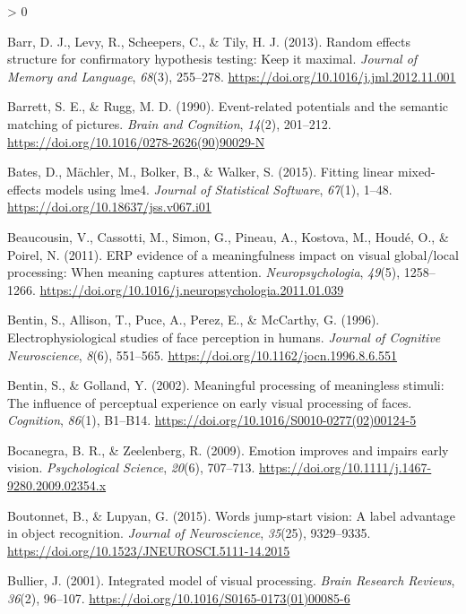 \documentclass[
  english,
  man,floatsintext]{apa7}
\newlength{\cslhangindent}
\newenvironment{CSLReferences}[2] %
 {%
  \setlength{\parindent}{0pt}
  \ifodd #1 \everypar{\setlength{\hangindent}{\cslhangindent}}\ignorespaces\fi
  \ifnum #2 > 0
  \setlength{\parskip}{#2\baselineskip}
  \fi
 }%
 {}
\begin{document}
\begin{CSLReferences}{1}{0}
\leavevmode\hypertarget{ref-barr2013}{}%
Barr, D. J., Levy, R., Scheepers, C., \& Tily, H. J. (2013). Random effects structure for confirmatory hypothesis testing: Keep it maximal. \emph{Journal of Memory and Language}, \emph{68}(3), 255--278. \url{https://doi.org/10.1016/j.jml.2012.11.001}

\leavevmode\hypertarget{ref-barrett1990}{}%
Barrett, S. E., \& Rugg, M. D. (1990). Event-related potentials and the semantic matching of pictures. \emph{Brain and Cognition}, \emph{14}(2), 201--212. \url{https://doi.org/10.1016/0278-2626(90)90029-N}

\leavevmode\hypertarget{ref-R-lme4}{}%
Bates, D., Mächler, M., Bolker, B., \& Walker, S. (2015). Fitting linear mixed-effects models using {lme4}. \emph{Journal of Statistical Software}, \emph{67}(1), 1--48. \url{https://doi.org/10.18637/jss.v067.i01}

\leavevmode\hypertarget{ref-beaucousin2011}{}%
Beaucousin, V., Cassotti, M., Simon, G., Pineau, A., Kostova, M., Houdé, O., \& Poirel, N. (2011). ERP evidence of a meaningfulness impact on visual global/local processing: When meaning captures attention. \emph{Neuropsychologia}, \emph{49}(5), 1258--1266. \url{https://doi.org/10.1016/j.neuropsychologia.2011.01.039}

\leavevmode\hypertarget{ref-bentin1996}{}%
Bentin, S., Allison, T., Puce, A., Perez, E., \& McCarthy, G. (1996). Electrophysiological studies of face perception in humans. \emph{Journal of Cognitive Neuroscience}, \emph{8}(6), 551--565. \url{https://doi.org/10.1162/jocn.1996.8.6.551}

\leavevmode\hypertarget{ref-bentin2002}{}%
Bentin, S., \& Golland, Y. (2002). Meaningful processing of meaningless stimuli: The influence of perceptual experience on early visual processing of faces. \emph{Cognition}, \emph{86}(1), B1--B14. \url{https://doi.org/10.1016/S0010-0277(02)00124-5}

\leavevmode\hypertarget{ref-bocanegra2009}{}%
Bocanegra, B. R., \& Zeelenberg, R. (2009). Emotion improves and impairs early vision. \emph{Psychological Science}, \emph{20}(6), 707--713. \url{https://doi.org/10.1111/j.1467-9280.2009.02354.x}

\leavevmode\hypertarget{ref-boutonnet2015}{}%
Boutonnet, B., \& Lupyan, G. (2015). Words jump-start vision: A label advantage in object recognition. \emph{Journal of Neuroscience}, \emph{35}(25), 9329--9335. \url{https://doi.org/10.1523/JNEUROSCI.5111-14.2015}

\leavevmode\hypertarget{ref-bullier2001}{}%
Bullier, J. (2001). Integrated model of visual processing. \emph{Brain Research Reviews}, \emph{36}(2), 96--107. \url{https://doi.org/10.1016/S0165-0173(01)00085-6}


\end{CSLReferences}
\end{document}

